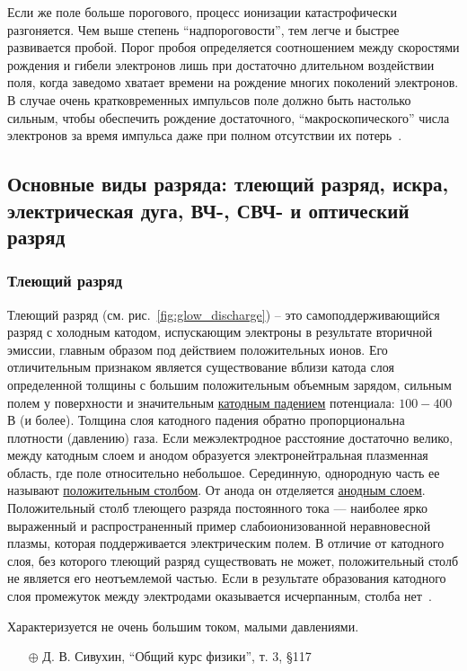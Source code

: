 \documentclass[10pt, a4paper]{article}
\begin{document}
Если же поле больше порогового, процесс ионизации катастрофически разгоняется. Чем выше степень ``надпороговости'', тем легче и быстрее развивается пробой. Порог пробоя определяется соотношением между скоростями рождения и гибели электронов лишь при достаточно длительном воздействии поля, когда заведомо хватает времени на рождение многих поколений электронов. В случае очень кратковременных импульсов поле должно быть настолько сильным, чтобы обеспечить рождение достаточного, ``макроскопического'' числа электронов за время импульса даже при полном отсутствии их потерь~\cite{raizer}. 

\subsection{Основные виды разряда: тлеющий разряд, искра, электрическая дуга, ВЧ-, СВЧ- и оптический разряд}

\subsubsection{Тлеющий разряд}

Тлеющий разряд (см. рис.~\ref{fig:glow_discharge}) -- это самоподдерживающийся разряд с холодным катодом, испускающим электроны в результате вторичной эмиссии, главным образом под действием положительных ионов. Его отличительным признаком является существование вблизи катода слоя определенной толщины с большим положительным объемным зарядом, сильным полем у поверхности и значительным \uline{катодным падением} потенциала: $100-400$ В (и более). Толщина слоя катодного падения обратно пропорциональна плотности (давлению) газа. Если межэлектродное расстояние достаточно велико, между катодным слоем и анодом образуется электронейтральная плазменная область, где поле относительно небольшое. Серединную, однородную часть ее называют \uline{положительным столбом}. От анода он отделяется \uline{анодным слоем}. Положительный столб тлеющего разряда постоянного тока — наиболее ярко выраженный и распространенный пример слабоионизованной неравновесной плазмы, которая поддерживается электрическим полем. В отличие от катодного слоя, без которого тлеющий разряд существовать не может, положительный столб не является его неотъемлемой частью. Если в результате образования катодного слоя промежуток между электродами оказывается исчерпанным, столба нет~\cite{raizer}.

Характеризуется не очень большим током, малыми давлениями.

\begin{itemize}
	\item[$\oplus$] Д. В. Сивухин, ``Общий курс физики'', т. 3, \S 117
\end{itemize}
\end{document}
